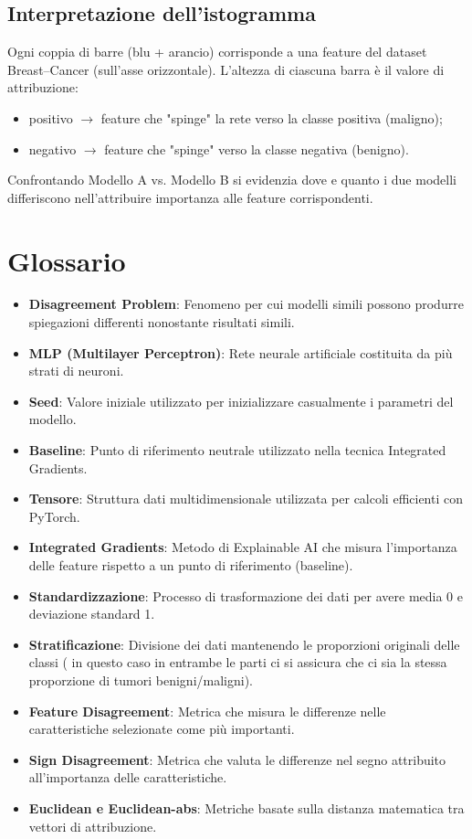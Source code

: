 \documentclass[a4paper,11pt]{article}
\begin{document}
\subsection*{Interpretazione dell'istogramma}
Ogni coppia di barre (blu + arancio) corrisponde a una feature del dataset Breast–Cancer (sull’asse orizzontale). 
L’altezza di ciascuna barra è il valore di attribuzione:
\begin{itemize}
  \item positivo $\to$ feature che "spinge" la rete verso la classe positiva (maligno);
  \item negativo $\to$ feature che "spinge" verso la classe negativa (benigno).
\end{itemize}
Confrontando Modello A vs. Modello B si evidenzia dove e quanto i due modelli differiscono nell'attribuire importanza alle feature corrispondenti.

\section{Glossario}
\begin{itemize}
\item \textbf{Disagreement Problem}: Fenomeno per cui modelli simili possono produrre spiegazioni differenti nonostante risultati simili.
\item \textbf{MLP (Multilayer Perceptron)}: Rete neurale artificiale costituita da più strati di neuroni.
\item \textbf{Seed}: Valore iniziale utilizzato per inizializzare casualmente i parametri del modello.
\item \textbf{Baseline}: Punto di riferimento neutrale utilizzato nella tecnica Integrated Gradients.
\item \textbf{Tensore}: Struttura dati multidimensionale utilizzata per calcoli efficienti con PyTorch.
\item \textbf{Integrated Gradients}: Metodo di Explainable AI che misura l'importanza delle feature rispetto a un punto di riferimento (baseline).
\item \textbf{Standardizzazione}: Processo di trasformazione dei dati per avere media 0 e deviazione standard 1.
\item \textbf{Stratificazione}: Divisione dei dati mantenendo le proporzioni originali delle classi ( in questo caso in entrambe le parti ci si assicura che ci sia la stessa proporzione di tumori benigni/maligni).
\item \textbf{Feature Disagreement}: Metrica che misura le differenze nelle caratteristiche selezionate come più importanti.
\item \textbf{Sign Disagreement}: Metrica che valuta le differenze nel segno attribuito all'importanza delle caratteristiche.
\item \textbf{Euclidean e Euclidean-abs}: Metriche basate sulla distanza matematica tra vettori di attribuzione.
\end{itemize}
\end{document}
